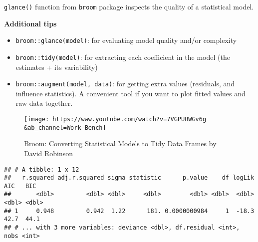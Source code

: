 \documentclass[
]{book}
\newenvironment{Shaded}{\begin{snugshade}}{\end{snugshade}}
\newcommand{\AttributeTok}[1]{\textcolor[rgb]{0.77,0.63,0.00}{#1}}
\newcommand{\CommentTok}[1]{\textcolor[rgb]{0.56,0.35,0.01}{\textit{#1}}}
\newcommand{\DecValTok}[1]{\textcolor[rgb]{0.00,0.00,0.81}{#1}}
\newcommand{\FunctionTok}[1]{\textcolor[rgb]{0.00,0.00,0.00}{#1}}
\newcommand{\NormalTok}[1]{#1}
\newcommand{\OtherTok}[1]{\textcolor[rgb]{0.56,0.35,0.01}{#1}}
\newcommand{\SpecialCharTok}[1]{\textcolor[rgb]{0.00,0.00,0.00}{#1}}
\providecommand{\tightlist}{%
  \setlength{\itemsep}{0pt}\setlength{\parskip}{0pt}}
\begin{document}
\texttt{glance()} function from \texttt{broom} package inspects the quality of a statistical model.

\textbf{Additional tips}

\begin{itemize}
\tightlist
\item
  \texttt{broom::glance(model)}: for evaluating model quality and/or complexity
\item
  \texttt{broom::tidy(model)}: for extracting each coefficient in the model (the estimates + its variability)
\item
  \texttt{broom::augment(model,\ data)}: for getting extra values (residuals, and influence statistics). A convenient tool if you want to plot fitted values and raw data together.
\end{itemize}

\begin{figure}
\centering
\texttt{[image: https://www.youtube.com/watch?v=7VGPUBWGv6g\\\&ab\_channel=Work-Bench]}
\caption{Broom: Converting Statistical Models to Tidy Data Frames by David Robinson}
\end{figure}

\begin{Shaded}
\end{Shaded}

\begin{verbatim}
## # A tibble: 1 x 12
##   r.squared adj.r.squared sigma statistic      p.value    df logLik   AIC   BIC
##       <dbl>         <dbl> <dbl>     <dbl>        <dbl> <dbl>  <dbl> <dbl> <dbl>
## 1     0.948         0.942  1.22      181. 0.0000000984     1  -18.3  42.7  44.1
## # ... with 3 more variables: deviance <dbl>, df.residual <int>, nobs <int>
\end{verbatim}

\begin{Shaded}
\end{Shaded}
\end{document}
